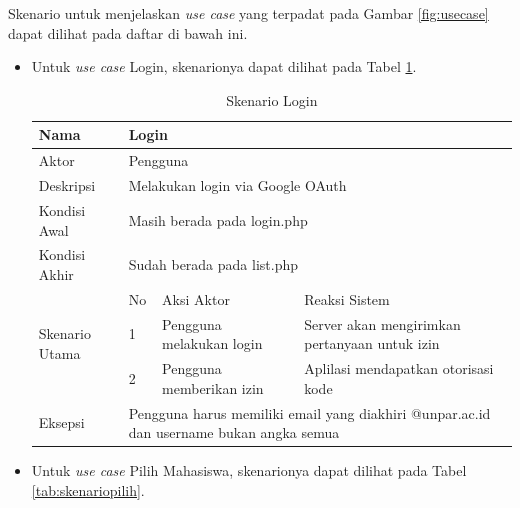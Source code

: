 Skenario untuk menjelaskan {\it use case} yang terpadat pada Gambar \ref{fig:usecase}
dapat dilihat pada daftar di bawah ini.
\begin{itemize}
\item Untuk {\it use case} Login, skenarionya dapat dilihat pada Tabel
\ref{tab:skenariologin}.

\begin{table}[ht]
\centering
\caption[Tabel Skenario Login]{Skenario Login}
\label{tab:skenariologin}
\begin{tabular}{|p{1.4cm}|p{0.4cm}|p{2cm}|p{2cm}|p{2cm}|p{2cm}|}
\hline
Nama & \multicolumn{5}{p{8cm}|}{Login} \\ \hline
Aktor & \multicolumn{5}{p{8cm}|}{Pengguna} \\ \hline
Deskripsi & \multicolumn{5}{p{8cm}|}{Melakukan login via Google OAuth} \\ \hline
Kondisi Awal & \multicolumn{5}{p{8cm}|}{Masih berada pada login.php} \\ \hline
Kondisi Akhir & \multicolumn{5}{p{8cm}|}{Sudah berada pada list.php}
\\ \hline
\multirow{3}{*}{\parbox{1.4cm}{Skenario Utama}} & No &
\multicolumn{2}{p{4cm}|}{Aksi Aktor} & \multicolumn{2}{p{4cm}|}{Reaksi Sistem}
\\ \cline{2-6}
& 1 & \multicolumn{2}{p{4cm}|}{Pengguna melakukan login} &
\multicolumn{2}{p{4cm}|}{Server akan mengirimkan pertanyaan untuk izin} \\
\cline{2-6} & 2 & \multicolumn{2}{p{4cm}|}{Pengguna memberikan izin} &
\multicolumn{2}{p{4cm}|}{Aplilasi mendapatkan otorisasi kode} \\ \hline
Eksepsi & \multicolumn{5}{p{8cm}|}{Pengguna harus memiliki email yang diakhiri
@unpar.ac.id dan username bukan angka semua} \\ \hline
\end{tabular}
\end{table}

\item Untuk {\it use case} Pilih Mahasiswa, skenarionya dapat dilihat pada Tabel
\ref{tab:skenariopilih}.


\end{itemize}
